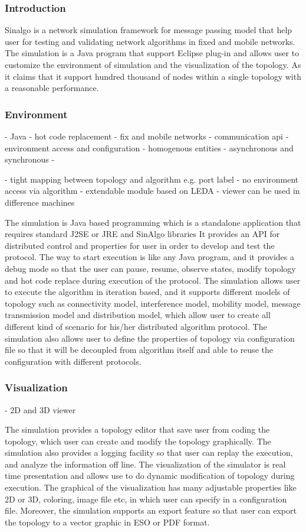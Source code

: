 \subsubsection{Introduction}
Sinalgo is a network simulation framework for message passing model that help user for testing and validating network algorithms in fixed and mobile networks. The simulation is a Java program that support Eclipse plug-in and allows user to customize the environment of simulation and the visualization of the topology. As it claims that it support hundred thousand of nodes within a single topology with a reasonable performance.


\subsubsection{Environment}
- Java
- hot code replacement
- fix and mobile networks
- communication api
- environment access and configuration
- homogenous entities
- asynchronous and synchronous 
- 

- tight mapping between topology and algorithm e.g. port label
- no environment access via algorithm
- extendable module based on LEDA
- viewer can be used in difference machines


The simulation is Java based programming which is a standalone application that requires standard J2SE or JRE and SinAlgo libraries It provides an API for distributed control and properties for user in order to develop and test the protocol. The way to start execution is like any Java program, and it provides a debug mode so that the user can pause, resume, observe states, modify topology and hot code replace during execution of the protocol. The simulation allows user to execute the algorithm in iteration based, and it supports different models of topology such as connectivity model, interference model, mobility model, message transmission model and distribution model, which allow user to create all different kind of scenario for his/her distributed algorithm protocol. The simulation also allows user to define the properties of topology via configuration file so that it will be decoupled from algorithm itself and able to reuse the configuration with different protocols.

\subsubsection{Visualization}
- 2D and 3D viewer


The simulation provides a topology editor that save user from coding the topology, which user can create and modify the topology graphically. The simulation also provides a logging facility so that user can replay the execution, and analyze the information off line. The visualization of the simulator is real time presentation and allows use to do dynamic modification of topology during execution. The graphical of the visualization has many adjustable properties like 2D or 3D, coloring, image file etc, in which user can specify in a configuration file. Moreover, the simulation supports an export feature so that user can export the topology to a vector graphic in ESO or PDF format.

